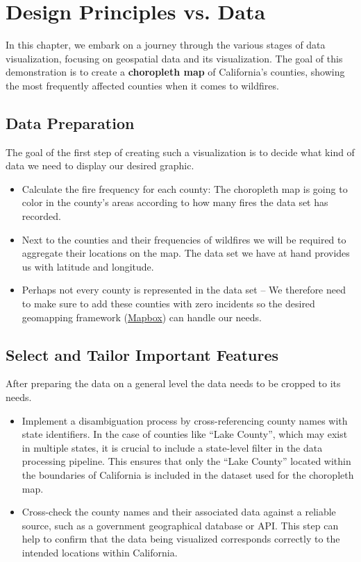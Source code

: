 \chapter{Design Principles vs. Data}
In this chapter, we embark on a journey through the various stages of data visualization, focusing on geospatial data and its visualization. The goal of this demonstration is to create a \textbf{choropleth map} of California's counties, showing the most frequently affected counties when it comes to wildfires.

\section*{Data Preparation}
The goal of the first step of creating such a visualization is to decide what kind of data we need to display our desired graphic.

\begin{itemize}
    \item Calculate the fire frequency for each county: The choropleth map is going to color in the county's areas according to how many fires the data set has recorded.
    \item Next to the counties and their frequencies of wildfires we will be required to aggregate their locations on the map. The data set we have at hand provides us with latitude and longitude.
    \item Perhaps not every county is represented in the data set -- We therefore need to make sure to add these counties with zero incidents so the desired geomapping framework (\href{https://www.mapbox.com/}{Mapbox}) can handle our needs.
\end{itemize}

\section*{Select and Tailor Important Features}
After preparing the data on a general level the data needs to be cropped to its needs.

\begin{itemize}
    \item Implement a disambiguation process by cross-referencing county names with state identifiers. In the case of counties like ``Lake County'', which may exist in multiple states, it is crucial to include a state-level filter in the data processing pipeline. This ensures that only the ``Lake County'' located within the boundaries of California is included in the dataset used for the choropleth map.
    \item Cross-check the county names and their associated data against a reliable source, such as a government geographical database or API. This step can help to confirm that the data being visualized corresponds correctly to the intended locations within California.
\end{itemize}

